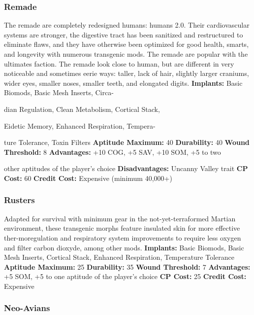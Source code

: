 \subsubsection{Remade}

The remade are completely redesigned humans: 
humans 2.0. Their cardiovascular systems are stronger, 
the digestive tract has been sanitized and restructured 
to eliminate flaws, and they have otherwise been optimized
for good health, smarts, and longevity with numerous
transgenic mods. The remade are popular with
the ultimates faction. The remade look close to human, 
but are different in very noticeable and sometimes eerie 
ways: taller, lack of hair, slightly larger craniums, wider 
eyes, smaller noses, smaller teeth, and elongated digits.
\textbf{Implants: }Basic Biomods, Basic Mesh Inserts, Circa-

dian Regulation, Clean Metabolism, Cortical Stack, 

Eidetic Memory, Enhanced Respiration, Tempera-

ture Tolerance, Toxin Filters
\textbf{Aptitude Maximum: }40
\textbf{Durability:} 40
\textbf{Wound Threshold: }8
\textbf{Advantages:} +10 COG, +5 SAV, +10 SOM, +5 to two 

other aptitudes of the player's choice
\textbf{Disadvantages: }Uncanny Valley trait
\textbf{CP Cost:} 60
\textbf{Credit Cost: }Expensive (minimum 40,000+)

\subsubsection{Rusters}

Adapted for survival with minimum gear in the not-yet-terraformed
Martian environment, these transgenic
morphs feature insulated skin for more effective ther-moregulation
and respiratory system improvements to
require less oxygen and filter carbon dioxyde, among 
other mods.
\textbf{Implants: }Basic Biomods, Basic Mesh Inserts, Cortical 
Stack, Enhanced Respiration, Temperature Tolerance
\textbf{Aptitude Maximum: }25
\textbf{Durability: }35
\textbf{Wound Threshold: }7
\textbf{Advantages:} +5 SOM, +5 to one aptitude of the 
player's choice
\textbf{CP Cost:} 25
\textbf{Credit Cost: }Expensive

\subsubsection{Neo-Avians}

